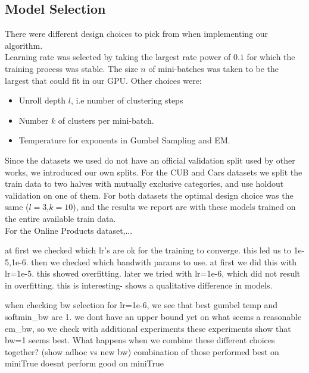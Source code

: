 \subsection{Model Selection}
There were different design choices to pick from when implementing our algorithm.\\
Learning rate was selected by taking the largest rate power of $0.1$ for which the training process was stable.
The size $n$ of mini-batches was taken to be the largest that could fit in our GPU.  
Other choices were:
\begin{itemize}
\item Unroll depth $l$, i.e number of clustering steps 
\item Number $k$ of clusters per mini-batch.
\item Temperature for exponents in Gumbel Sampling and EM. 
\end{itemize}
Since the datasets we used do not have an official validation split used by other works, we introduced our own splits. For the CUB and Cars datasets we split the train data to two halves with mutually exclusive categories, and use holdout validation on one of them. For both datasets the optimal design choice was the same ($l=3$,$k=10$), and the results we report are with these models trained on the entire available train data.\\
For the Online Products dataset,...


at first we checked which lr's are ok for the training to converge. this led us to 1e-5,1e-6.
then we checked which bandwith params to use. at first we did this with lr=1e-5. this showed overfitting.
later we tried with lr=1e-6, which did not result in overfitting. this is interesting- shows a qualitative difference in models.

when checking bw selection for lr=1e-6, we see that best gumbel temp and softmin_bw are 1. we dont have an upper bound yet on what seems a reasonable em_bw, so we check with additional experiments
these experiments show that bw=1 seems best.
What happens when we combine these different choices together?
(show adhoc vs new bw)
combination of those performed best on miniTrue doesnt perform good on miniTrue 

